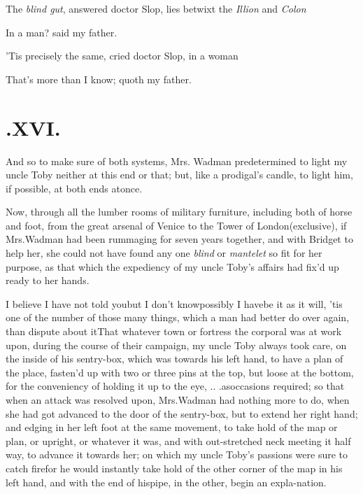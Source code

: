 \documentclass{article}
\begin{document}
The \textit{blind gut}, answered doctor Slop, lies betwixt the
\textit{Illion} and \textit{Colon}\tsh

\tsh In a man? said my father.

\tsh ’Tis precisely the same, cried
doctor Slop, in a woman\tsh

That’s more than I know; quoth my father.

\vfill{}\eject
\section{.\enspace XVI.}

\quad
\tsh And so to make sure of both systems, Mrs.
Wadman predetermined to light my uncle Toby neither
at this end or that; but, like a prodigal’s candle, to light
him, if possible, at both ends at\break once.

Now, through all the lumber rooms of military furniture,
including both of horse and foot, from the great arsenal\break 
of Venice to the Tower of London\break (exclusive), if
Mrs.\@ Wadman had been rummaging for seven years together, and
with Bridget to help her, she could not have found any one
\textit{blind} or \textit{man\-telet} so fit for her purpose, as that
which the expediency of my uncle Toby’s affairs had
fix’d up ready to her hands.

I believe I have not told you\tsh but I don’t know\tsh possibly I have\tsh be it
as it will, ’tis one of the number of those many things, which a man had better do
over again, than dispute about it\tsk That whatever town or fortress the corporal was
at work upon, during the course of their campaign, my uncle Toby always took care,
on the inside of his sentry-box, which was towards his left hand, to have a plan of
the place, fasten’d up with two or three pins at the top, but loose at the bottom,
for the conveniency of holding it up to the eye, \etc .\@ .\@
.\@ as\break occasions required;
so that when an attack was resolved upon, Mrs.\@ Wadman had nothing more to do, when
she had got advanced to the door of the sentry-box, but to extend her right hand;
and edging in her left foot at the same movement, to take hold of the map or plan,
or upright, or whatever it was, and with out-stretched neck meeting it half way, \tsk 
to advance it towards her; on which my uncle Toby’s passions
were sure to catch fire\tsh for he would instantly take hold of
the other corner of the map in his left hand, and with the end
of his\break pipe, in the other, begin an expla-\break nation.
\end{document}

